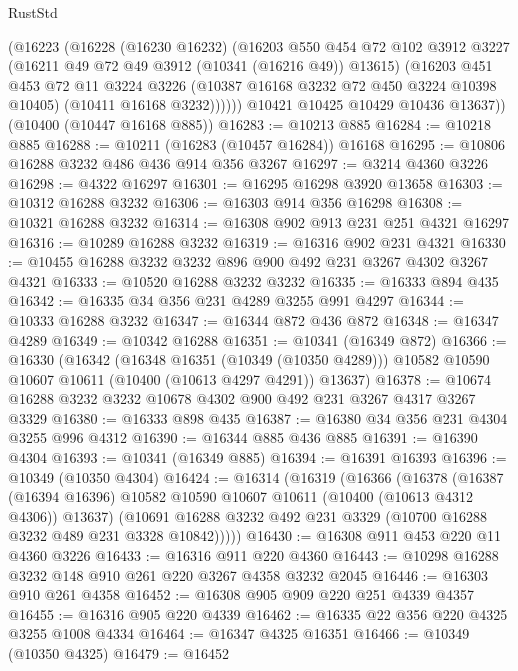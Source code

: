 \begin{lexlean}{RustStd}
\begin{coremodule}
{\begin{coremodule}
{{{{{{{{{{{{{{{{{{{{{{{{{          (@16223
            (@16228
              (@16230 @16232)
              (@16203
                @550
                @454
                @72
                @102
                @3912
                @3227
                (@16211 @49 @72 @49 @3912 (@10341 (@16216 @49)) @13615)
                (@16203
                  @451
                  @453
                  @72
                  @11
                  @3224
                  @3226
                  (@10387 @16168 @3232 @72 @450 @3224 @10398 @10405)
                  (@10411 @16168 @3232))))))
        @10421
        @10425
        @10429
        @10436
        @13637))
    (@10400 (@10447 @16168 @885))
@16283 := @10213 @885
@16284 := @10218 @885
@16288 := @10211 (@16283 (@10457 @16284)) @16168
@16295 := @10806 @16288 @3232 @486 @436 @914 @356 @3267
@16297 := @3214 @4360 @3226
@16298 := @4322 @16297
@16301 := @16295 @16298 @3920 @13658
@16303 := @10312 @16288 @3232
@16306 := @16303 @914 @356 @16298
@16308 := @10321 @16288 @3232
@16314 := @16308 @902 @913 @231 @251 @4321 @16297
@16316 := @10289 @16288 @3232
@16319 := @16316 @902 @231 @4321
@16330 := @10455 @16288 @3232 @3232 @896 @900 @492 @231 @3267 @4302 @3267 @4321
@16333 := @10520 @16288 @3232 @3232
@16335 := @16333 @894 @435
@16342 := @16335 @34 @356 @231 @4289 @3255 @991 @4297
@16344 := @10333 @16288 @3232
@16347 := @16344 @872 @436 @872
@16348 := @16347 @4289
@16349 := @10342 @16288
@16351 := @10341 (@16349 @872)
@16366 := @16330
    (@16342
      (@16348 @16351 (@10349 (@10350 @4289)))
      @10582
      @10590
      @10607
      @10611
      (@10400 (@10613 @4297 @4291))
      @13637)
@16378 := @10674 @16288 @3232 @3232 @10678 @4302 @900 @492 @231 @3267 @4317 @3267 @3329
@16380 := @16333 @898 @435
@16387 := @16380 @34 @356 @231 @4304 @3255 @996 @4312
@16390 := @16344 @885 @436 @885
@16391 := @16390 @4304
@16393 := @10341 (@16349 @885)
@16394 := @16391 @16393
@16396 := @10349 (@10350 @4304)
@16424 := @16314
    (@16319
      (@16366
        (@16378
          (@16387 (@16394 @16396) @10582 @10590 @10607 @10611 (@10400 (@10613 @4312 @4306)) @13637)
          (@10691 @16288 @3232 @492 @231 @3329 (@10700 @16288 @3232 @489 @231 @3328 @10842)))))
@16430 := @16308 @911 @453 @220 @11 @4360 @3226
@16433 := @16316 @911 @220 @4360
@16443 := @10298 @16288 @3232 @148 @910 @261 @220 @3267 @4358 @3232 @2045
@16446 := @16303 @910 @261 @4358
@16452 := @16308 @905 @909 @220 @251 @4339 @4357
@16455 := @16316 @905 @220 @4339
@16462 := @16335 @22 @356 @220 @4325 @3255 @1008 @4334
@16464 := @16347 @4325 @16351
@16466 := @10349 (@10350 @4325)
@16479 := @16452
}}}}}}}}}}}}}}}}}}}}}}}}}
\end{coremodule}}
\end{coremodule}
\end{lexlean}
